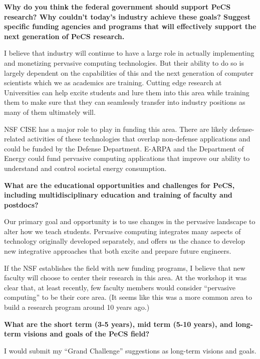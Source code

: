 \begin{flushenumbf}
\item \textbf{Why do you think the federal government should support PeCS
research? Why couldn't today's industry achieve these goals? Suggest specific
funding agencies and programs that will effectively support the next
generation of PeCS research.}

I believe that industry will continue to have a large role in actually
implementing and monetizing pervasive computing technologies. But their
ability to do so is largely dependent on the capabilities of this and the
next generation of computer scientists which we as academics are training.
Cutting edge research at Universities can help excite students and lure them
into this area while training them to make sure that they can seamlessly
transfer into industry positions as many of them ultimately will.

NSF CISE has a major role to play in funding this area. There are likely
defense-related activities of these technologies that overlap non-defense
applications and could be funded by the Defense Department. E-ARPA and the
Department of Energy could fund pervasive computing applications that improve
our ability to understand and control societal energy consumption.

\item \textbf{What are the educational opportunities and challenges for PeCS,
including multidisciplinary education and training of faculty and postdocs?}

Our primary goal and opportunity is to use changes in the pervasive landscape
to alter how we teach students. Pervasive computing integrates many aspects
of technology originally developed separately, and offers us the chance to
develop new integrative approaches that both excite and prepare future
engineers.

If the NSF establishes the field with new funding programs, I believe that
new faculty will choose to center their research in this area. At the
workshop it was clear that, at least recently, few faculty members would
consider ``pervasive computing'' to be their core area. (It seems like this
was a more common area to build a research program around 10 years ago.)

\item \textbf{What are the short term (3-5 years), mid term (5-10 years), and
long-term visions and goals of the PeCS field?}

I would submit my ``Grand Challenge'' suggestions as long-term visions and
goals.


\end{flushenumbf}
